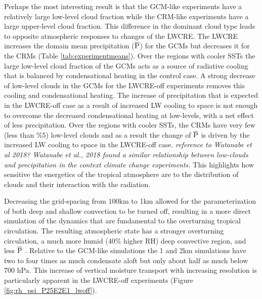 \documentclass[draft]{agujournal2019}
\begin{document}
{Perhaps the most interesting result is that the GCM-like experiments have a relatively large low-level 
cloud fraction while the CRM-like experiments have a large upper-level cloud fraction.  
This difference in the dominant cloud type leads to opposite atmospheric responses to changes of the LWCRE.  
The LWCRE increases the domain mean precipitation ($\overline{\rm{P}}$) for the GCMs but 
decreases it for the CRMs (Table \ref{tab:experimentmeans}).  
Over the regions with cooler SSTs the large low-level cloud fraction of the GCMs 
acts as a source of radiative cooling that is balanced by condensational heating in the control case.  
A strong decrease of low-level clouds in the GCMs
for the LWCRE-off experiments removes this cooling and condensational heating.  The increase 
of precipitation that is expected in the LWCRE-off case as a result of increased LW cooling to space is not enough
to overcome the decreased condensational heating at low-levels, with a net effect of less precipitation.  
Over the regions with cooler SSTs, the CRMs have very few (less than \%5) low-level clouds and as a result the 
change of $\overline{\rm{P}}$ is driven by the increased LW cooling to space in the LWCRE-off case.
\textit{reference to Watanabe et al 2018?  Watanabe et al., 2018 found a similar relationship between 
low-clouds and precipitation in the context climate change experiments.}
This highlights how sensitive the energetics of the tropical atmosphere are to the distribution of clouds and 
their interaction with the radiation.      

Decreasing the grid-spacing from $100 \textrm{km}$ to 1km allowed for the parameterization of both deep and shallow 
convection to be turned off, resulting in a more direct simulation of the dynamics that are
fundamental to the overturning tropical circulation.  The resulting atmospheric state has a stronger overturning 
circulation, a much more humid (40\% higher RH) deep convective region, and less $\overline{\rm{P}}$ .  
Relative to the GCM-like simulations the 1 and 2km simulations have two to four times as much condensate
aloft but only about half as much below 700 hPa.  This increase of vertical moisture transport with increasing 
resolution is particularly apparent in the LWCRE-off experiments (Figure \ref{fig:rh_psi_P25E2E1_lwoff}).   

}
\end{document}
